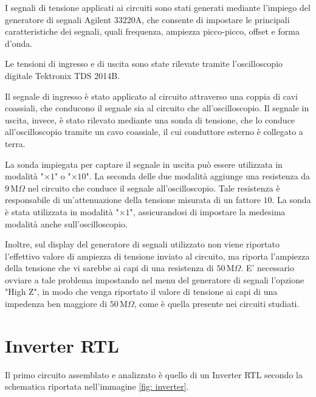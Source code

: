 \documentclass[a4paper,12pt]{article}
\begin{document}
I segnali di tensione applicati ai circuiti sono stati generati mediante l'impiego del generatore di segnali Agilent 33220A, che consente di impostare le principali caratteristiche dei segnali, quali frequenza, ampiezza picco-picco, offset e forma d’onda.

Le tensioni di ingresso e di uscita sono state rilevate tramite l’oscilloscopio digitale Tektronix TDS 2014B.

Il segnale di ingresso è stato applicato al circuito attraverso una coppia di cavi coassiali, che conducono il segnale sia al circuito che all’oscilloscopio. Il segnale in uscita, invece, è stato rilevato mediante una sonda di tensione, che lo conduce all’oscilloscopio tramite un cavo coassiale, il cui conduttore esterno è collegato a terra.

La sonda impiegata per captare il segnale in uscita può essere utilizzata in modalità "$\times 1$" o "$\times 10$". 
La seconda delle due modalità aggiunge una resistenza da $9\,\mathrm{M}\Omega$ nel circuito che conduce il segnale all'oscilloscopio. Tale resistenza è responsabile di un'attenuazione della tensione misurata di un fattore $10$.
La sonda è stata utilizzata in modalità "$\times 1$", assicurandosi di impostare la medesima modalità anche sull'oscilloscopio.

Inoltre, sul display del generatore di segnali utilizzato non viene riportato l'effettivo valore di ampiezza di tensione inviato al circuito, ma riporta l'ampiezza della tensione che vi sarebbe ai capi di una resistenza di $50\,\mathrm{M}\Omega$. E' necessario ovviare a tale problema impostando nel menu del generatore di segnali l'opzione "High $\mathrm{Z}$", in modo che venga riportato il valore di tensione ai capi di una impedenza ben maggiore di $50\,\mathrm{M}\Omega$, come è quella presente nei circuiti studiati.



\section{Inverter RTL}
Il primo circuito assemblato e analizzato è quello di un Inverter RTL secondo la schematica riportata nell'immagine \ref{fig: inverter}.
\end{document}
